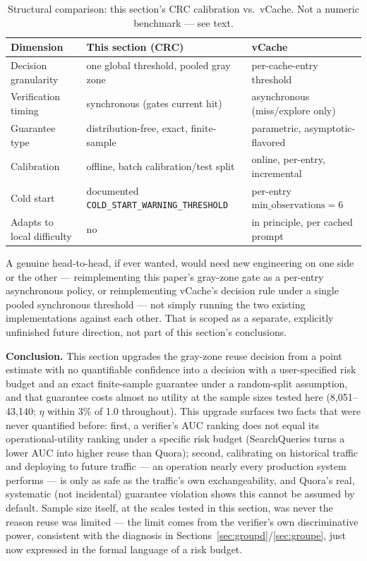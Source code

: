 \documentclass[11pt]{article}
\newenvironment{fittab}{\begin{lrbox}{\fittabbox}}{\end{lrbox}%
  \ifdim\wd\fittabbox>\linewidth\resizebox{\linewidth}{!}{\usebox{\fittabbox}}\else\usebox{\fittabbox}\fi}
\begin{document}
\begin{table}[h]
\centering
\small
\begin{fittab}\begin{tabular}{@{}lll@{}}
\toprule
\textbf{Dimension} & \textbf{This section (CRC)} & \textbf{vCache} \\
\midrule
Decision granularity & one global threshold, pooled gray zone & per-cache-entry threshold \\
Verification timing & synchronous (gates current hit) & asynchronous (miss/explore only) \\
Guarantee type & distribution-free, exact, finite-sample & parametric, asymptotic-flavored \\
Calibration & offline, batch calibration/test split & online, per-entry, incremental \\
Cold start & documented \texttt{COLD\_\allowbreak{}START\_\allowbreak{}WARNING\_\allowbreak{}THRESHOLD} & per-entry $\text{min\_observations}=6$ \\
Adapts to local difficulty & no & in principle, per cached prompt \\
\bottomrule
\end{tabular}\end{fittab}
\caption{Structural comparison: this section's CRC calibration vs.\ vCache. Not a numeric benchmark --- see text.}
\end{table}

A genuine head-to-head, if ever wanted, would need new engineering on one side or the other --- reimplementing this paper's gray-zone gate as a per-entry asynchronous policy, or reimplementing vCache's decision rule under a single pooled synchronous threshold --- not simply running the two existing implementations against each other. That is scoped as a separate, explicitly unfinished future direction, not part of this section's conclusions.

\textbf{Conclusion.} This section upgrades the gray-zone reuse decision from a point estimate with no quantifiable confidence into a decision with a user-specified risk budget and an exact finite-sample guarantee under a random-split assumption, and that guarantee costs almost no utility at the sample sizes tested here (8{,}051--43{,}140; $\eta$ within 3\% of 1.0 throughout). This upgrade surfaces two facts that were never quantified before: first, a verifier's AUC ranking does not equal its operational-utility ranking under a specific risk budget (SearchQueries turns a lower AUC into higher reuse than Quora); second, calibrating on historical traffic and deploying to future traffic --- an operation nearly every production system performs --- is only as safe as the traffic's own exchangeability, and Quora's real, systematic (not incidental) guarantee violation shows this cannot be assumed by default. Sample size itself, at the scales tested in this section, was never the reason reuse was limited --- the limit comes from the verifier's own discriminative power, consistent with the diagnosis in Sections~\ref{sec:groupd}/\ref{sec:groupe}, just now expressed in the formal language of a risk budget.
\end{document}
